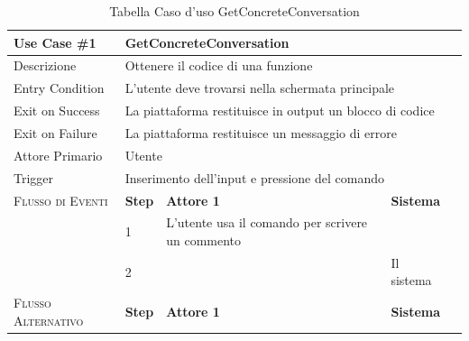 \begin{table}[hp]
    \renewcommand\arraystretch{1.5}
    \newcommand\mcl[1]{\multicolumn{4}{l}{#1}}
    \centering
    \caption{Tabella Caso d'uso GetConcreteConversation}
    \label{tab:tabella-getconcreteconversation}
    \begin{tabularx}{\textwidth}{llXXl}
        \toprule
        \textbf{Use Case \#1}       & \mcl{\textbf{GetConcreteConversation}}                                                                                            \\ \toprule
        Descrizione                 & \mcl{Ottenere il codice di una funzione}                                                                                          \\ \midrule
        Entry Condition             & \mcl{L'utente deve trovarsi nella schermata principale}                                                                           \\ \midrule
        Exit on Success             & \mcl{La piattaforma restituisce in output un blocco di codice}                                                                    \\ \midrule
        Exit on Failure             & \mcl{La piattaforma restituisce un messaggio di errore}                                                                           \\ \midrule
        Attore Primario             & \mcl{Utente}                                                                                                                      \\ \midrule
        Trigger                     & \mcl{Inserimento dell'input e pressione del comando}                                                                              \\ \midrule
        \textsc{Flusso di Eventi}   & \textbf{Step} & \textbf{Attore 1}                                 & \textbf{Sistema}                                              \\ \cline{2-5}
                                    & 1             & L'utente usa il comando per scrivere un commento  &                                                               \\ \cline{2-5}
                                    & 2             &                                                   & Il sistema     \\ \midrule
        \textsc{Flusso Alternativo} & \textbf{Step} & \textbf{Attore 1}                                 & \textbf{Sistema}                                              \\ \cline{2-5}

\end{tabularx}
\end{table}
